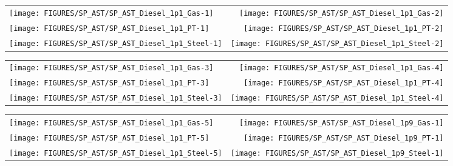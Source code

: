 \begin{figure}[h!]
\begin{tabular*}{\textwidth}{l@{\extracolsep{\fill}}r}
\texttt{[image: FIGURES/SP\_AST/SP\_AST\_Diesel\_1p1\_Gas-1]}   &  \texttt{[image: FIGURES/SP\_AST/SP\_AST\_Diesel\_1p1\_Gas-2]}    \\
\texttt{[image: FIGURES/SP\_AST/SP\_AST\_Diesel\_1p1\_PT-1]}    &  \texttt{[image: FIGURES/SP\_AST/SP\_AST\_Diesel\_1p1\_PT-2]}     \\
\texttt{[image: FIGURES/SP\_AST/SP\_AST\_Diesel\_1p1\_Steel-1]} &  \texttt{[image: FIGURES/SP\_AST/SP\_AST\_Diesel\_1p1\_Steel-2]}
\end{tabular*}
\label{SP_Diesel_1p1_1m}
\end{figure}

\newpage

\begin{figure}[p]
\begin{tabular*}{\textwidth}{l@{\extracolsep{\fill}}r}
\texttt{[image: FIGURES/SP\_AST/SP\_AST\_Diesel\_1p1\_Gas-3]}   &  \texttt{[image: FIGURES/SP\_AST/SP\_AST\_Diesel\_1p1\_Gas-4]}   \\
\texttt{[image: FIGURES/SP\_AST/SP\_AST\_Diesel\_1p1\_PT-3]}    &  \texttt{[image: FIGURES/SP\_AST/SP\_AST\_Diesel\_1p1\_PT-4]}    \\
\texttt{[image: FIGURES/SP\_AST/SP\_AST\_Diesel\_1p1\_Steel-3]} &  \texttt{[image: FIGURES/SP\_AST/SP\_AST\_Diesel\_1p1\_Steel-4]}
\end{tabular*}
\label{SP_Diesel_1p1_3m}
\end{figure}

\begin{figure}[p]
\begin{tabular*}{\textwidth}{l@{\extracolsep{\fill}}r}
\texttt{[image: FIGURES/SP\_AST/SP\_AST\_Diesel\_1p1\_Gas-5]}   &  \texttt{[image: FIGURES/SP\_AST/SP\_AST\_Diesel\_1p9\_Gas-1]}   \\
\texttt{[image: FIGURES/SP\_AST/SP\_AST\_Diesel\_1p1\_PT-5]}    &  \texttt{[image: FIGURES/SP\_AST/SP\_AST\_Diesel\_1p9\_PT-1]}    \\
\texttt{[image: FIGURES/SP\_AST/SP\_AST\_Diesel\_1p1\_Steel-5]} &  \texttt{[image: FIGURES/SP\_AST/SP\_AST\_Diesel\_1p9\_Steel-1]}
\end{tabular*}
\label{SP_Diesel_1p1_5m}
\end{figure}

